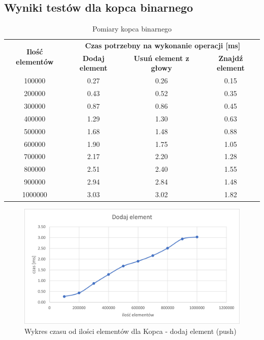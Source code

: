 \documentclass{article}
\begin{document}
    \subsection{Wyniki testów dla kopca binarnego}
    \begin{table}[H]
        \centering
        \begin{tabular}{|c|ccc|}
            \hline
            \multirow{2}{*}{\textbf{Ilość   elementów}} & \multicolumn{3}{c|}{\textbf{Czas   potrzebny na wykonanie operacji {[}ms{]}}} \\ \cline{2-4} 
             & \multicolumn{1}{c|}{\textbf{Dodaj element}} & \multicolumn{1}{c|}{\textbf{Usuń element z głowy}} & \textbf{Znajdź element} \\ \hline
            100000 & \multicolumn{1}{c|}{0.27} & \multicolumn{1}{c|}{0.26} & 0.15 \\ \hline
            200000 & \multicolumn{1}{c|}{0.43} & \multicolumn{1}{c|}{0.52} & 0.35 \\ \hline
            300000 & \multicolumn{1}{c|}{0.87} & \multicolumn{1}{c|}{0.86} & 0.45 \\ \hline
            400000 & \multicolumn{1}{c|}{1.29} & \multicolumn{1}{c|}{1.30} & 0.63 \\ \hline
            500000 & \multicolumn{1}{c|}{1.68} & \multicolumn{1}{c|}{1.48} & 0.88 \\ \hline
            600000 & \multicolumn{1}{c|}{1.90} & \multicolumn{1}{c|}{1.75} & 1.05 \\ \hline
            700000 & \multicolumn{1}{c|}{2.17} & \multicolumn{1}{c|}{2.20} & 1.28 \\ \hline
            800000 & \multicolumn{1}{c|}{2.51} & \multicolumn{1}{c|}{2.40} & 1.55 \\ \hline
            900000 & \multicolumn{1}{c|}{2.94} & \multicolumn{1}{c|}{2.84} & 1.48 \\ \hline
            1000000 & \multicolumn{1}{c|}{3.03} & \multicolumn{1}{c|}{3.02} & 1.82 \\ \hline
        \end{tabular}
        \caption{Pomiary kopca binarnego}
    \end{table}


    
    \begin{figure}[H]
        \centering
        \includegraphics[scale = 0.85]{wykresy/heap/add.png}
        \caption{Wykres czasu od ilości elementów dla Kopca - dodaj element (push)}
    \end{figure}
    
\end{document}
